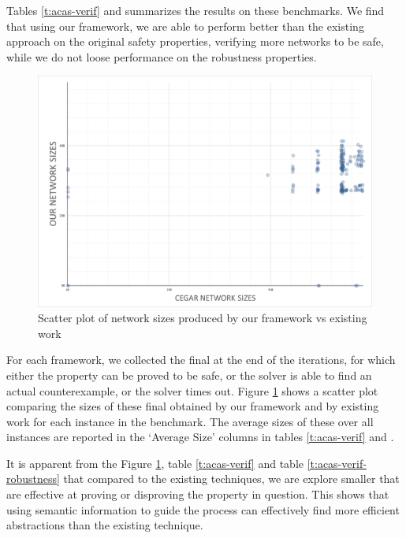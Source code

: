 Tables \ref{t:acas-verif} and \label{t:acas-verif-robustness} summarizes the
results on these benchmarks. We
find that using our framework, we are able to perform better than the existing
\cegar approach \cite{cegar-nn} on the original safety properties, verifying
more networks to be safe, while we do not loose performance on the robustness
properties. 

\begin{figure}
    \vspace*{-1cm}
    \includegraphics[scale=0.2]{figs/scatter-cegar-our-nerualsat.png}
    \caption{Scatter plot of network sizes produced by our framework vs existing
    work \cite{cegar-nn}}
    \label{f:scatter-netsizes}
    \vspace*{-1cm}
\end{figure}

For each framework, we collected the final \abs at the end of the \cegar
iterations, for which either the property can be proved to be safe, or 
the solver is able to find an actual counterexample, or the solver times out.  
Figure \ref{f:scatter-netsizes} shows a scatter plot comparing the sizes of these final \abs
obtained by our framework and by existing work \cite{cegar-nn} for each instance
in the benchmark. The average sizes of these \abs over all instances are
reported in the `Average Size' columns in tables \ref{t:acas-verif} and
\label{t:acas-verif-robustness}. 

It is apparent from the Figure \ref{f:scatter-netsizes}, 
table \ref{t:acas-verif} and table \ref{t:acas-verif-robustness} that compared 
to the existing techniques, we are explore smaller \abs that are effective 
at proving or disproving the property in question.
This shows that using semantic information to guide the \cegar process can
effectively find more efficient abstractions than the existing technique.

